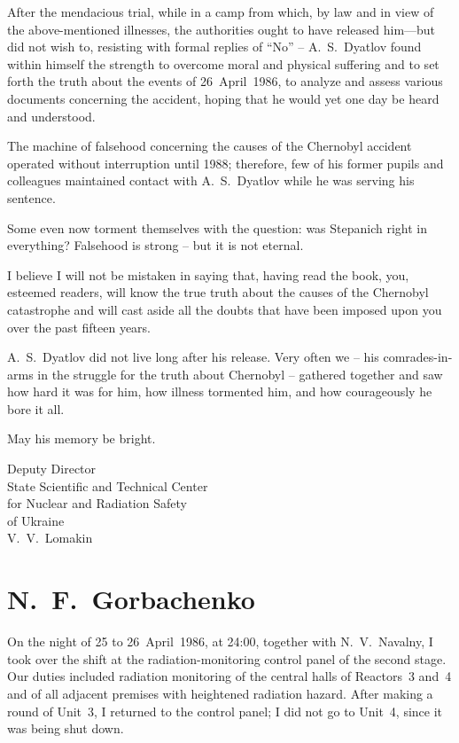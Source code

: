 \documentclass[openright]{bookest}
\begin{document}
After the mendacious trial, while in a camp from which, by law and in view of the above-mentioned illnesses, the authorities ought to have released him—but did not wish to, resisting with formal replies of ``No'' -- A.~S.~Dyatlov found within himself the strength to overcome moral and physical suffering and to set forth the truth about the events of 26~April~1986, to analyze and assess various documents concerning the accident, hoping that he would yet one day be heard and understood.

The machine of falsehood concerning the causes of the Chernobyl accident operated without interruption until 1988; therefore, few of his former pupils and colleagues maintained contact with A.~S.~Dyatlov while he was serving his sentence.

Some even now torment themselves with the question: was Stepanich right in everything? Falsehood is strong -- but it is not eternal.

I believe I will not be mistaken in saying that, having read the book, you, esteemed readers, will know the true truth about the causes of the Chernobyl catastrophe and will cast aside all the doubts that have been imposed upon you over the past fifteen years.

A.~S.~Dyatlov did not live long after his release. Very often we -- his comrades-in-arms in the struggle for the truth about Chernobyl -- gathered together and saw how hard it was for him, how illness tormented him, and how courageously he bore it all.

May his memory be bright.

\begin{flushright}
Deputy Director\\
State Scientific and Technical Center\\
for Nuclear and Radiation Safety\\
of Ukraine\\[0.5\baselineskip]
V.~V.~Lomakin
\end{flushright}

\section*{N.~F.~Gorbachenko}

On the night of 25 to 26~April~1986, at 24{:}00, together with N.~V.~Navalny, I took over the shift at the radiation-monitoring control panel of the second stage. Our duties included radiation monitoring of the central halls of Reactors~3 and~4 and of all adjacent premises with heightened radiation hazard. After making a round of Unit~3, I returned to the control panel; I did not go to Unit~4, since it was being shut down.
\end{document}
